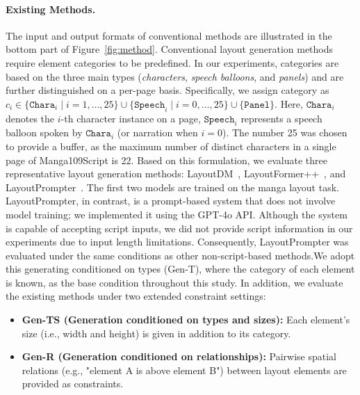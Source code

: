 \documentclass[sigconf, screen, review, anonymous]{acmart}
\begin{document}
\paragraph{Existing Methods.}
The input and output formats of conventional methods are illustrated in the bottom part of Figure~\ref{fig:method}. Conventional layout generation methods require element categories to be predefined. In our experiments, categories are based on the three main types (\textit{characters}, \textit{speech balloons}, and \textit{panels}) and are further distinguished on a per-page basis. Specifically, we assign category as $c_i \in \{\texttt{Chara}_i \mid i=1,\dots,25\} \cup \{\texttt{Speech}_i \mid i=0,\dots,25\} \cup \{\texttt{Panel}\}$. Here, $\texttt{Chara}_i$ denotes the $i$-th character instance on a page, $\texttt{Speech}_i$ represents a speech balloon spoken by $\texttt{Chara}_i$ (or narration when $i = 0$). The number 25 was chosen to provide a buffer, as the maximum number of distinct characters in a single page of Manga109Script is 22. Based on this formulation, we evaluate three representative layout generation methods: LayoutDM~\cite{inoue2023layoutdm}, LayoutFormer++~\cite{jiang_layoutformer_2023}, and LayoutPrompter~\cite{lin_layoutprompter_2023}. The first two models are trained on the manga layout task. LayoutPrompter, in contrast, is a prompt-based system that does not involve model training; we implemented it using the GPT-4o API. Although the system is capable of accepting script inputs, we did not provide script information in our experiments due to input length limitations. Consequently, LayoutPrompter was evaluated under the same conditions as other non-script-based methods.We adopt this generating conditioned on types (Gen-T), where the category of each element is known, as the base condition throughout this study. In addition, we evaluate the existing methods under two extended constraint settings: 

\begin{itemize}
  \item \textbf{Gen-TS (Generation conditioned on types and sizes):} Each element's size (i.e., width and height) is given in addition to its category.
  \item \textbf{Gen-R (Generation conditioned on relationships):} Pairwise spatial relations (e.g., "element A is above element B") between layout elements are provided as constraints.
\end{itemize}
\end{document}
